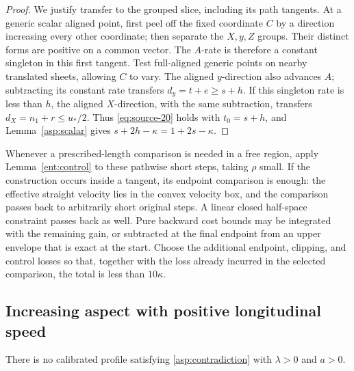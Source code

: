 \begin{proof}
We justify transfer to the grouped slice, including its path tangents.
At a generic scalar aligned point, first peel off the fixed coordinate
\(C\) by a direction increasing every other coordinate; then separate
the \(X,y,Z\) groups. Their distinct forms are positive on a common
vector. The \(A\)-rate is therefore a constant singleton in this first
tangent. Test full-aligned generic points on nearby translated sheets,
allowing \(C\) to vary. The aligned \(y\)-direction also advances \(A\);
subtracting its constant rate transfers \(d_y=t+e\ge s+h\).
If this singleton rate is less than \(h\), the aligned \(X\)-direction,
with the same subtraction, transfers
\(d_X=n_1+r\le u_*/2\). Thus \eqref{eq:source-20} holds with
\(t_0=s+h\), and Lemma~\ref{asp:scalar} gives
\(s+2h-\kappa=1+2s-\kappa\).
\end{proof}

Whenever a prescribed-length comparison is needed in a free region, apply
Lemma~\ref{ent:control} to these pathwise short steps, taking \(\rho\)
small. If the construction occurs inside a tangent, its endpoint comparison
is enough: the effective straight velocity lies in the convex velocity box,
and the comparison passes back to arbitrarily short original steps. A
linear closed half-space constraint passes back as well. Pure backward
cost bounds may be integrated with the remaining gain, or subtracted at
the final endpoint from an upper envelope that is exact at the start.
Choose the additional endpoint, clipping, and control losses so that,
together with the loss already incurred in the selected comparison,
the total is less than \(10\kappa\).

\subsection{Increasing aspect with positive longitudinal speed}

\begin{proposition}\label{asp:increasing-positive}
There is no calibrated profile satisfying \eqref{asp:contradiction} with
\(\lambda>0\) and \(a>0\).
\end{proposition}

